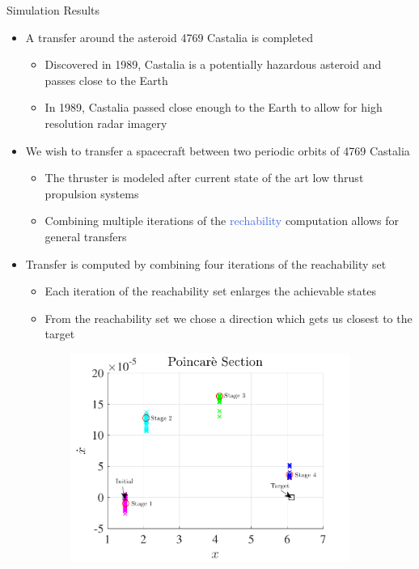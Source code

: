 \documentclass[final, usenames, dvipsnames]{beamer}
\newlength{\onecolwidth}
\def\Emph{\textcolor{RoyalBlue}}
\begin{document}
\begin{frame}[t]
\begin{columns}[T,onlytextwidth]
\begin{column}{\onecolwidth}
\begin{block}{Simulation Results} %
	\begin{itemize}
		\item A transfer around the asteroid 4769 Castalia is completed
        \begin{itemize}
            \item Discovered in 1989, Castalia is a potentially hazardous asteroid and passes close to the Earth
            \item In 1989, Castalia passed close enough to the Earth to allow for high resolution radar imagery
        \end{itemize}
        \item We wish to transfer a spacecraft between two periodic orbits of 4769 Castalia
        \begin{itemize}
            \item The thruster is modeled after current state of the art low thrust propulsion systems
            \item Combining multiple iterations of the \Emph{rechability} computation allows for general transfers
        \end{itemize}
        \item Transfer is computed by combining four iterations of the reachability set
        \begin{itemize}
            \item Each iteration of the reachability set enlarges the achievable states
            \item From the reachability set we chose a direction which gets us closest to the target
        \end{itemize}
    \end{itemize}
    \begin{figure}[htbp] 
        \centering 
        \begin{subfigure}[htbp]{0.5\textwidth} 
            \includegraphics[width=\textwidth]{figures/poincare_xvsxdot.pdf} 

\end{subfigure}
\end{figure}
\end{block}
\end{column}
\end{columns}
\end{frame}
\end{document}
